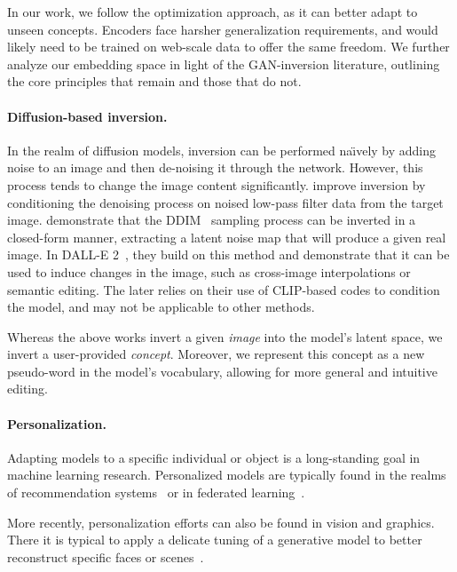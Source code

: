 In our work, we follow the optimization approach, as it can better adapt to unseen concepts. Encoders face harsher generalization requirements, and would likely need to be trained on web-scale data to offer the same freedom. We further analyze our embedding space in light of the GAN-inversion literature, outlining the core principles that remain and those that do not.

\paragraph{Diffusion-based inversion.} In the realm of diffusion models, inversion can be performed na\"{\i}ve{ly} by adding noise to an image and then de-noising it through the network. However, this process tends to change the image content significantly. \citet{choi2021ilvr} improve inversion by conditioning the denoising process on noised low-pass filter data from the target image. \citep{dhariwal2021diffusion} demonstrate that the DDIM~\citep{song2020denoising} sampling process can be inverted in a closed-form manner, extracting a latent noise map that will produce a given real image. In DALL-E 2~\citep{ramesh2022hierarchical}, they build on this method and demonstrate that it can be used to induce changes in the image, such as cross-image interpolations or semantic editing. The later relies on their use of CLIP-based codes to condition the model, and may not be applicable to other methods.

Whereas the above works invert a given \textit{image} into the model's latent space, we invert a user-provided \textit{concept}. Moreover, we represent this concept as a new pseudo-word in the model's vocabulary, allowing for more general and intuitive editing.

\paragraph{Personalization.}
Adapting models to a specific individual or object is a long-standing goal in machine learning research. Personalized models are typically found in the realms of recommendation systems~\citep{benhamdi2017personalized,fernando2018artwork,martinez2009s,cho2002personalized} or in federated learning~\citep{mansour2020three,jiang2019improving,fallah2020personalized,shamsian2021personalized}.

More recently, personalization efforts can also be found in vision and graphics. There it is typical to apply a delicate tuning of a generative model to better reconstruct specific faces or scenes~\citep{semantic2019bau,roich2021pivotal,alaluf2021hyperstyle,dinh2022hyperinverter,cao2022authentic,nitzan2022mystyle}. 


